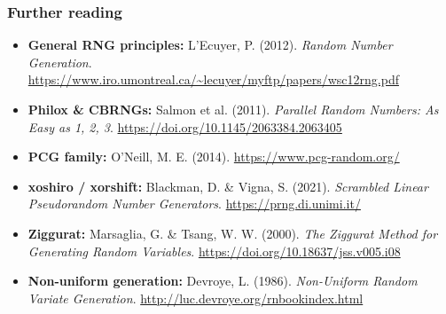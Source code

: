 \documentclass[aspectratio=169]{beamer}
\begin{document}
\begin{frame}
\frametitle{Further reading}

\begin{itemize}
    \item \textbf{General RNG principles:} L'Ecuyer, P. (2012). \textit{Random Number Generation}. \url{https://www.iro.umontreal.ca/~lecuyer/myftp/papers/wsc12rng.pdf}
    \item \textbf{Philox \& CBRNGs:} Salmon et al. (2011). \textit{Parallel Random Numbers: As Easy as 1, 2, 3}. \url{https://doi.org/10.1145/2063384.2063405}
    \item \textbf{PCG family:} O'Neill, M. E. (2014). \url{https://www.pcg-random.org/}
    \item \textbf{xoshiro / xorshift:} Blackman, D. \& Vigna, S. (2021). \textit{Scrambled Linear Pseudorandom Number Generators}. \url{https://prng.di.unimi.it/}
    \item \textbf{Ziggurat:} Marsaglia, G. \& Tsang, W. W. (2000). \textit{The Ziggurat Method for Generating Random Variables}. \url{https://doi.org/10.18637/jss.v005.i08}
    \item \textbf{Non-uniform generation:} Devroye, L. (1986). \textit{Non-Uniform Random Variate Generation}. \url{http://luc.devroye.org/rnbookindex.html}
\end{itemize}

\end{frame}
\end{document}

